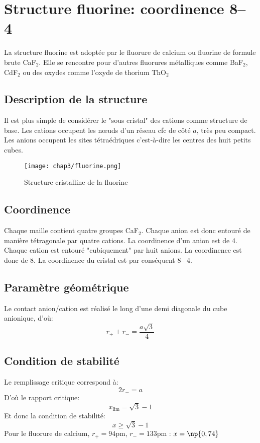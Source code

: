 \section{Structure fluorine: coordinence 8\--- 4}
La structure fluorine est adoptée par le fluorure de calcium ou fluorine de formule
brute CaF$_2$. Elle se rencontre pour d'autres fluorures métalliques comme
BaF$_2$, CdF$_2$ ou des oxydes comme l'oxyde de 
thorium ThO$_2$


\subsection{Description de la structure}
Il est plus simple de considérer le "sous cristal" des cations comme structure de base.
Les cations occupent les n\oe uds d'un réseau cfc de côté $a$, très peu compact. Les anions
occupent les sites tétraédriques c'est-à-dire les centres des huit petits cubes.
\begin{figure}
    \centering
    \texttt{[image: chap3/fluorine.png]}
    \caption{Structure cristalline de la fluorine}\label{fig:3_fluorine}
\end{figure}


\subsection{Coordinence}
Chaque maille contient quatre groupes CaF$_2$. Chaque anion est donc entouré de
manière tétragonale par quatre cations. La coordinence d'un anion est de 4.
Chaque cation est entouré "cubiquement" par huit anions. La coordinence est donc
de 8. La coordinence du cristal est par conséquent 8\--- 4.


\subsection{Paramètre géométrique}
Le contact anion/cation est réalisé le long d'une demi diagonale du cube anionique,
d'où:
\begin{equation}
    r_+ + r_- = \frac{a\sqrt{3}}{4}
    \label{eq:3_caf2_r+r-a}
\end{equation}


\subsection{Condition de stabilité}
Le remplissage critique correspond à:
\begin{equation}
    2r_- = a
    \label{eq:3_caf2_lim_r-a}
\end{equation}
D'où le rapport critique:
\begin{equation}
    x_\text{lim} = \sqrt{3} - 1
    \label{eq:3_caf2_xlim}
\end{equation}
Et donc la condition de stabilité:
\begin{equation}
    \boxed{x \geq \sqrt{3} - 1}
    \label{eq:3_caf2_stabx}
\end{equation}
Pour le fluorure de calcium, $r_+ = 94$pm, $r_- = 133$pm :
$x = \np{0,74}$


